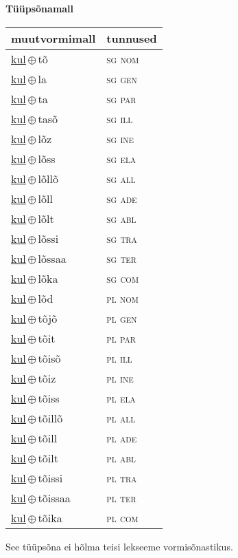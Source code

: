 

\vspace{3.5em}
\noindent \begin{minipage}{\textwidth}
\noindent \textbf{Tüüpsõnamall \,}\\

\begin{sideways}
\begin{tabular}{l l}
muutvormimall & tunnused \\
\hline
\underline{kul}\,$\oplus$\,tõ & \textsc{ sg nom } \\
\underline{kul}\,$\oplus$\,la & \textsc{ sg gen } \\
\underline{kul}\,$\oplus$\,ta & \textsc{ sg par } \\
\underline{kul}\,$\oplus$\,tasõ & \textsc{ sg ill } \\
\underline{kul}\,$\oplus$\,lõz & \textsc{ sg ine } \\
\underline{kul}\,$\oplus$\,lõss & \textsc{ sg ela } \\
\underline{kul}\,$\oplus$\,lõllõ & \textsc{ sg all } \\
\underline{kul}\,$\oplus$\,lõll & \textsc{ sg ade } \\
\underline{kul}\,$\oplus$\,lõlt & \textsc{ sg abl } \\
\underline{kul}\,$\oplus$\,lõssi & \textsc{ sg tra } \\
\underline{kul}\,$\oplus$\,lõssaa & \textsc{ sg ter } \\
\underline{kul}\,$\oplus$\,lõka & \textsc{ sg com } \\
\underline{kul}\,$\oplus$\,lõd & \textsc{ pl nom } \\
\underline{kul}\,$\oplus$\,tõjõ & \textsc{ pl gen } \\
\underline{kul}\,$\oplus$\,tõit & \textsc{ pl par } \\
\underline{kul}\,$\oplus$\,tõisõ & \textsc{ pl ill } \\
\underline{kul}\,$\oplus$\,tõiz & \textsc{ pl ine } \\
\underline{kul}\,$\oplus$\,tõiss & \textsc{ pl ela } \\
\underline{kul}\,$\oplus$\,tõillõ & \textsc{ pl all } \\
\underline{kul}\,$\oplus$\,tõill & \textsc{ pl ade } \\
\underline{kul}\,$\oplus$\,tõilt & \textsc{ pl abl } \\
\underline{kul}\,$\oplus$\,tõissi & \textsc{ pl tra } \\
\underline{kul}\,$\oplus$\,tõissaa & \textsc{ pl ter } \\
\underline{kul}\,$\oplus$\,tõika & \textsc{ pl com } \\
\end{tabular}
\end{sideways}
\label{tab:tüüpsõnamall-kultõ}

\end{minipage}

 
\vspace{1em}
\noindent See tüüpsõna ei hõlma teisi lekseeme vormi\-sõnastikus.
